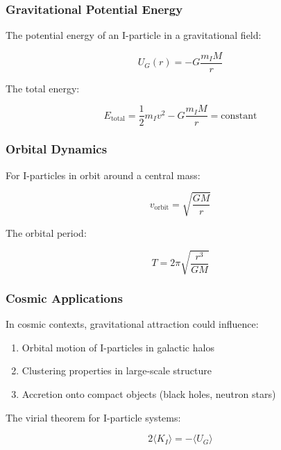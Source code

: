 \subsubsection{Gravitational Potential Energy}

The potential energy of an I-particle in a gravitational field:

\begin{equation}
\label{eq:gravitational_potential}
U_G(r) = -G\frac{m_I M}{r}
\end{equation}

The total energy:

\begin{equation}
\label{eq:total_energy}
E_{\text{total}} = \frac{1}{2}m_I v^2 - G\frac{m_I M}{r} = \text{constant}
\end{equation}

\subsubsection{Orbital Dynamics}

For I-particles in orbit around a central mass:

\begin{equation}
\label{eq:orbital_velocity}
v_{\text{orbit}} = \sqrt{\frac{GM}{r}}
\end{equation}

The orbital period:

\begin{equation}
\label{eq:orbital_period}
T = 2\pi\sqrt{\frac{r^3}{GM}}
\end{equation}

\subsubsection{Cosmic Applications}

In cosmic contexts, gravitational attraction could influence:

\begin{enumerate}
    \item Orbital motion of I-particles in galactic halos
    \item Clustering properties in large-scale structure
    \item Accretion onto compact objects (black holes, neutron stars)
\end{enumerate}

The virial theorem for I-particle systems:

\begin{equation}
\label{eq:virial_theorem}
2\langle K_I \rangle = -\langle U_G \rangle
\end{equation}

